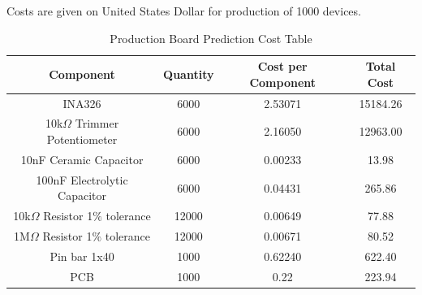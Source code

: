 Costs are given on United States Dollar for production of 1000 devices.\\
\begin{table}[htb]
  \begin{center}
    \ABNTEXreducedfont
    \caption[Production Board Prediction Cost Table]{Production Board Prediction Cost Table}
    \label{Production-cost}
    \begin{tabular}{|c|c|c|c|}
     \hline
    Component & Quantity & Cost per Component & Total Cost \\ \hline
    INA326 & 6000 & 2.53071 & 15184.26\\ \hline
    10k$\Omega$ Trimmer Potentiometer & 6000 & 2.16050 & 12963.00 \\ \hline
    10nF Ceramic Capacitor & 6000 & 0.00233 & 13.98 \\ \hline
    100nF Electrolytic Capacitor & 6000 & 0.04431 & 265.86 \\ \hline
    10k$\Omega$ Resistor 1$\%$ tolerance & 12000 & 0.00649 & 77.88 \\ \hline
    1M$\Omega$ Resistor 1$\%$ tolerance & 12000 & 0.00671 & 80.52 \\ \hline
    Pin bar 1x40 & 1000 & 0.62240 & 622.40 \\ \hline
    PCB & 1000 & 0.22 & 223.94 \\ \hline
  \end{tabular}
\end{center}
\end{table}
